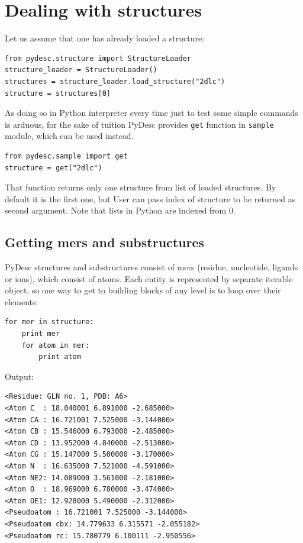 \documentclass{article}
\begin{document}

\section{Dealing with structures} \label{STCsec}

Let us assume that one has already loaded a structure:

\begin{lstlisting}
from pydesc.structure import StructureLoader
structure_loader = StructureLoader()
structures = structure_loader.load_structure("2dlc")
structure = structures[0]
\end{lstlisting}

    As doing so in Python interpreter every time just to test some simple commands is arduous, for the sake of tuition PyDesc provides \texttt{get} function in \texttt{sample} module, which can be used instead.

\begin{lstlisting}
from pydesc.sample import get
structure = get("2dlc")
\end{lstlisting}
    
    That function returns only one structure from list of loaded structures. By default it is the first one, but User can pass index of structure to be returned as second argument. Note that lists in Python are indexed from 0.

%
%
%
\subsection{Getting mers and substructures}

    PyDesc structures and substructures consist of mers (residue, nucleotide, ligands or ions), which consist of atoms. Each entity is represented by separate iterable object, so one way to get to building blocks of any level is to loop over their elements:

\begin{lstlisting}
for mer in structure:
    print mer
    for atom in mer:
        print atom
\end{lstlisting}
Output:
\begin{lstlisting}
<Residue: GLN no. 1, PDB: A6>
<Atom C  : 18.040001 6.891000 -2.685000>
<Atom CA : 16.721001 7.525000 -3.144000>
<Atom CB : 15.546000 6.793000 -2.485000>
<Atom CD : 13.952000 4.840000 -2.513000>
<Atom CG : 15.147000 5.500000 -3.170000>
<Atom N  : 16.635000 7.521000 -4.591000>
<Atom NE2: 14.089000 3.561000 -2.181000>
<Atom O  : 18.969000 6.780000 -3.474000>
<Atom OE1: 12.928000 5.490000 -2.312000>
<Pseudoatom : 16.721001 7.525000 -3.144000>
<Pseudoatom cbx: 14.779633 6.315571 -2.055182>
<Pseudoatom rc: 15.780779 6.100111 -2.950556>
\end{lstlisting}
\end{document}
